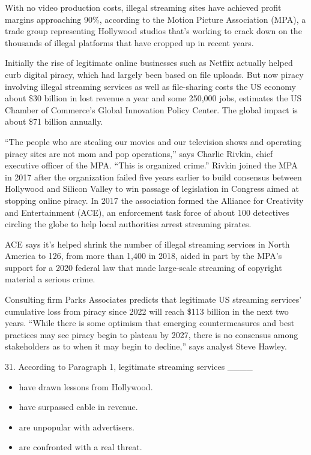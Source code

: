 \documentclass[UTF8,11pt]{ctexart}
\begin{document}
With no video production costs, illegal streaming sites have achieved profit margins approaching 90\%, according to the Motion Picture Association (MPA), a trade group representing Hollywood studios that’s working to crack down on the thousands of illegal platforms that have cropped up in recent years.


Initially the rise of legitimate online businesses such as Netflix actually helped curb digital piracy, which had largely been based on file uploads. But now piracy involving illegal streaming services as well as file-sharing costs the US economy about \$30 billion in lost revenue a year and some 250,000 jobs, estimates the US Chamber of Commerce’s Global Innovation Policy Center. The global impact is about \$71 billion annually.


“The people who are stealing our movies and our television shows and operating piracy sites are not mom and pop operations,” says Charlie Rivkin, chief executive officer of the MPA. “This is organized crime.” Rivkin joined the MPA in 2017 after the organization failed five years earlier to build consensus between Hollywood and Silicon Valley to win passage of legislation in Congress aimed at stopping online piracy. In 2017 the association formed the Alliance for Creativity and Entertainment (ACE), an enforcement task force of about 100 detectives circling the globe to help local authorities arrest streaming pirates.


ACE says it’s helped shrink the number of illegal streaming services in North America to 126, from more than 1,400 in 2018, aided in part by the MPA’s support for a 2020 federal law that made large-scale streaming of copyright material a serious crime.


Consulting firm Parks Associates predicts that legitimate US streaming services’ cumulative loss from piracy since 2022 will reach \$113 billion in the next two years. “While there is some optimism that emerging countermeasures and best practices may see piracy begin to plateau by 2027, there is no consensus among stakeholders as to when it may begin to decline,” says analyst Steve Hawley.


31. According to Paragraph 1, legitimate streaming services \_\_\_\_


\begin{itemize}[leftmargin=2em,itemsep=.2em,topsep=.4em]\item[A.] have drawn lessons from Hollywood.
\item[B.] have surpassed cable in revenue.
\item[C.] are unpopular with advertisers.
\item[D.] are confronted with a real threat.
\end{itemize}
\end{document}
